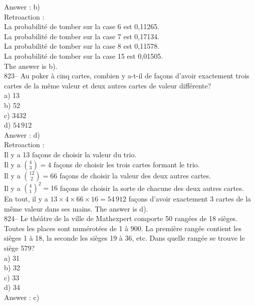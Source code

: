 ﻿\documentclass[letterpaper, 12pt]{article}
\begin{document}
Answer : b)\\

Retroaction : \\
La probabilit\'e de tomber sur la case 6 est 0,11265.\\
La probabilit\'e de tomber sur la case 7 est 0,17134.\\
La probabilit\'e de tomber sur la case 8 est 0,11578.\\
La probabilit\'e de tomber sur la case 15 est 0,01505.\\
The answer is b).\\

823-- Au poker \`a cinq cartes, combien y a-t-il de fa\c cons d'avoir
exactement trois cartes de la m\^eme valeur et deux autres cartes de valeur
diff\'erente?\\
a) 13\\
b) 52\\
c) 3432\\
d) $54\,912$\\

Answer : d)\\

Retroaction : \\
Il y a 13 fa\c cons de choisir la valeur du trio.\\ [2mm] Il y a
$\binom{4}{3}=4$ fa\c cons de choisir les trois cartes formant le
trio.\\ [2mm] Il y a $\binom{12}{2}=66$ fa\c cons de choisir la
valeur des deux autres cartes.\\ [2mm] Il y a $\binom{4}{1}^{2}=16$
fa\c cons de choisir la sorte de chacune des deux autres cartes.\\
[2mm]
En tout, il y a $13\times4\times66\times16=54\,912$ fa\c cons d'avoir
exactement 3 cartes de la m\^eme valeur dans ses mains.  The answer is
d).\\

824-- Le th\'e\^atre de la ville de Mathexpert comporte 50 rang\'ees de 18
si\`eges.  Toutes  les places sont num\'erot\'ees de 1 \`a 900.  La
premi\`ere rang\'ee contient les si\`eges 1 \`a 18, la seconde les si\`eges
19 \`a 36, etc.  Dans quelle rang\'ee se trouve le si\`ege 579?\\
a) 31\\
b) 32\\
c) 33\\
d) 34\\

Answer : c) \\
\end{document}
